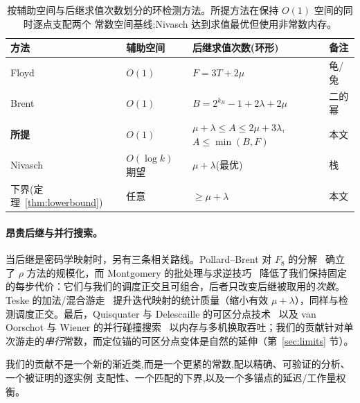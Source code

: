 \documentclass[11pt]{ctexart}
\begin{document}
\begin{table}[H]\centering
\caption{按辅助空间与后继求值次数划分的环检测方法。所提方法在保持 $O(1)$ 空间的同时逐点支配两个
常数空间基线;Nivasch 达到求值最优但使用非常数内存。}
\label{tab:related}
\begin{tabular}{llll}
\toprule
方法 & 辅助空间 & 后继求值次数(环形) & 备注\\
\midrule
Floyd~\cite{floyd1967} & $O(1)$ & $F=3T+2\mu$ & 龟/兔\\
Brent~\cite{brent1980} & $O(1)$ & $B=2^{k_B}\!-\!1+2\lambda+2\mu$ & 二的幂\\
\textbf{所提} & $O(1)$ & $\mu+\lambda\le A\le 2\mu+3\lambda$, $A\le\min(B,F)$ & 本文\\
Nivasch~\cite{nivasch2004} & $O(\log k)$ 期望 & $\mu+\lambda$(最优) & 栈\\
\midrule
下界(定理~\ref{thm:lowerbound}) & 任意 & $\ge\mu+\lambda$ & 本文\\
\bottomrule
\end{tabular}
\end{table}

\paragraph{昂贵后继与并行搜索。}
当后继是密码学映射时，另有三条相关路线。Pollard--Brent 对 $F_8$ 的分解~\cite{brent1981} 确立了 $\rho$ 方法的规模化，而 Montgomery 的批处理与求逆技巧~\cite{montgomery1987} 降低了我们保持固定的每步代价：它们与我们的调度正交且可组合，后者只改变后继被取用的\emph{次数}。Teske 的加法/混合游走~\cite{teske1998} 提升迭代映射的统计质量（缩小有效 $\mu+\lambda$），同样与检测调度正交。最后，Quisquater 与 Delescaille 的可区分点技术~\cite{qd1990} 以及 van Oorschot 与 Wiener 的并行碰撞搜索~\cite{vow1999} 以内存与多机换取吞吐；我们的贡献针对单次游走的\emph{串行}常数，而定位锚的可区分点变体是自然的延伸（第~\ref{sec:limits} 节）。

我们的贡献不是一个新的渐近类,而是一个更紧的常数,配以精确、可验证的分析、一个被证明的逐实例
支配性、一个匹配的下界,以及一个多锚点的延迟/工作量权衡。
\end{document}
